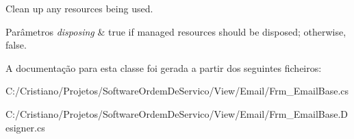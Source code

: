 Clean up any resources being used. 


\begin{DoxyParams}{Parâmetros}
{\em disposing} & true if managed resources should be disposed; otherwise, false.\\
\hline
\end{DoxyParams}


A documentação para esta classe foi gerada a partir dos seguintes ficheiros\+:\begin{DoxyCompactItemize}
\item 
C\+:/\+Cristiano/\+Projetos/\+Software\+Ordem\+De\+Servico/\+View/\+Email/Frm\+\_\+\+Email\+Base.\+cs\item 
C\+:/\+Cristiano/\+Projetos/\+Software\+Ordem\+De\+Servico/\+View/\+Email/Frm\+\_\+\+Email\+Base.\+Designer.\+cs\end{DoxyCompactItemize}
